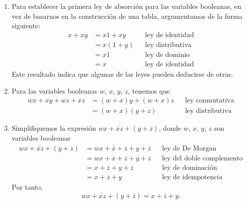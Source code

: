 \begin{myexample}
    \begin{enumerate}[label=\alph*)]
        \item Para establecer la primera ley de absorción para las variables booleanas, en vez de basarnos en la construcción de una tabla, argumentamos de la forma siguiente:
        \begin{align*}
            x + xy & = x1 + xy && \text{ley de identidad} \\
            & = x(1+y) && \text{ley distributiva} \\
            & = x1 && \text{ley de dominio} \\
            & = x && \text{ley de identidad}
        \end{align*}
        Este resultado indica que algunas de las leyes pueden deducirse de otras.
        \item Para las variables booleanas $w$, $x$, $y$, $z$, tenemos que
        \begin{align*}
            wx + xy + wz + xz & = (w + x)y + (w + x)z && \text{ley conmutativa} \\
            & = (w + x) (y + z) && \text{ley distributiva}
        \end{align*}
        \item Simplifiquemos la expresión $wx + \overline{\overline{x}z} + \left(y+\overline{z}\right)$, donde $w$, $x$, $y$, $z$ son variables booleanas
        \begin{align*}
            wx + \overline{\overline{x}z} + \left(y+\overline{z}\right) & = wx + \overline{\overline{x}} + \overline{z} + y + \overline{z} && \text{ley de De Morgan} \\
            & = wx + x + \overline{z} + y + \overline{z} && \text{ley del doble complemento} \\
            & = x + \overline{z} + y + \overline{z} && \text{ley de dominación} \\
            & = x + \overline{z} + y && \text{ley de idempotencia}
        \end{align*}
        Por tanto,
        $$wx + \overline{\overline{x}z} + \left(y+\overline{z}\right) = x + \overline{z} + y.$$
    \end{enumerate}
\end{myexample}

\newpage

